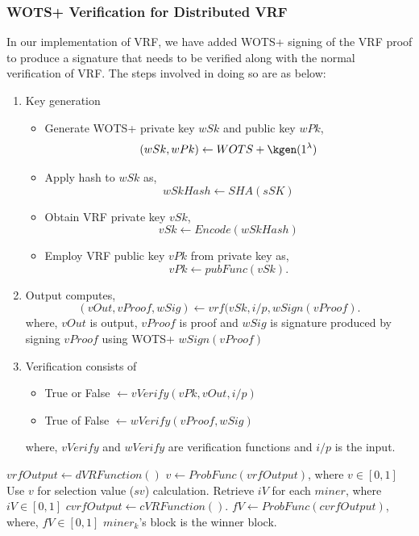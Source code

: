 \subsubsection{WOTS+ Verification for Distributed VRF} \label{definition:mvrf}
In our implementation of VRF, we have added WOTS+ signing of the VRF proof to produce a signature that
needs to be verified along with the normal verification of VRF. 
The steps involved in doing so are as below:
\begin{enumerate}
    \item Key generation
    \begin{itemize}
        \item Generate WOTS+ private key $wSk$ and public key $wPk$, $$(wSk,wPk) \leftarrow WOTS+\kgen(1^\lambda) $$
        \item Apply hash to $wSk$ as, $$wSkHash \leftarrow SHA(sSK)$$
        \item Obtain VRF private key $vSk$, $$vSk \leftarrow Encode(wSkHash) $$
        \item Employ VRF public key $vPk$ from private key as, $$vPk \leftarrow pubFunc(vSk). $$
    \end{itemize}
    \item Output computes, 
    $$(vOut, vProof, wSig) \leftarrow vrf(vSk, i/p, wSign(vProof). $$
    where, $vOut$ is output, $vProof$ is proof and $wSig$ is signature produced by signing
    $vProof$ using WOTS+ $wSign(vProof)$
    \item Verification consists of
    \begin{itemize}
        \item True or False $\leftarrow vVerify(vPk, vOut, i/p) $ 
        \item True of False $\leftarrow wVerify(vProof, wSig)$
    \end{itemize}
    where, $vVerify$ and $wVerify$ are verification functions and $i/p$ is the input.
\end{enumerate}

\begin{algorithm} [!htb]
  \caption{VRF for Selection Value and Miner Selection.} \label{alg:vrf}
  \begin{algorithmic}[1]
  \State $vrfOutput \leftarrow dVRFunction()$ 
  \State $v \leftarrow ProbFunc(vrfOutput)$, where $v \in [0,1]$
  \State Use $v$ for selection value ($sv$) calculation.
  \EndProcedure
  \State Retrieve $iV$ for each $miner$, where $iV \in [0,1]$
  \State $cvrfOutput \leftarrow cVRFunction()$.
  \State $fV \leftarrow ProbFunc(cvrfOutput)$, where, $fV \in [0,1]$
  \State $miner_k$'s block is the winner block.
  \EndIf
  \EndFor
  \EndProcedure
  \end{algorithmic}
\end{algorithm}

